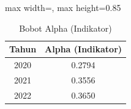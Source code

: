\begin{table}[H]
\centering
\caption{Bobot Alpha (Indikator)} \label{tab:samplealpha_s}
\begin{adjustbox}{max width=\textwidth, max height=0.85\textheight}
\begin{tabular}{|c|c|}
\hline
\textbf{Tahun} & \textbf{Alpha (Indikator)} \\
\hline
2020 & 0.2794 \\
2021 & 0.3556 \\
2022 & 0.3650 \\
\hline
\end{tabular}
\end{adjustbox}
\end{table}